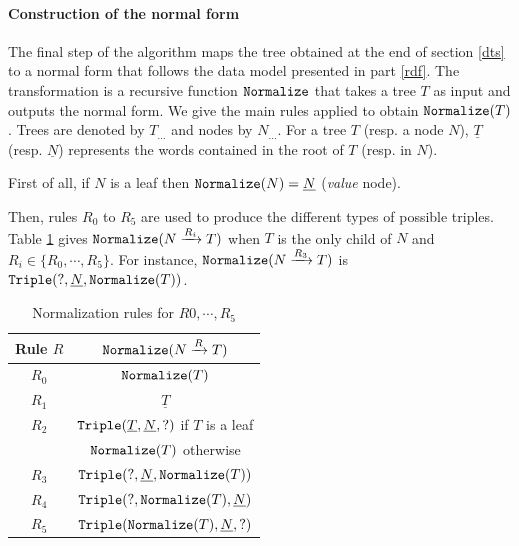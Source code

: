 
\paragraph{Construction of the normal form}
\label{cot}

The final step of the algorithm maps the tree obtained at the end of section \ref{dts} to a normal form that follows the data model presented in part \ref{rdf}. The transformation is a recursive function $\texttt{Normalize}$ that takes a tree $T$ as input and outputs the normal form. We give the main rules applied to obtain $\texttt{Normalize}(T)$. Trees are denoted by $T_{...}$ and nodes by $N_{...}$. For a tree $T$ (resp. a node $N$), $\underline{T}$ (resp. $\underline{N}$) represents the words contained in the root of $T$ (resp. in $N$).

First of all, if $N$ is a leaf then $\texttt{Normalize}(N) = \underline{N}$ (\textit{value} node).

Then, rules $R_0$ to $R_5$ are used to produce the different types of possible triples. Table \ref{normtab} gives $\texttt{Normalize}(N \xrightarrow{R_i} T)$ when $T$ is the only child of $N$ and $R_i \in \{R_0, \cdots, R_5\}$. For instance, $\texttt{Normalize}(N \xrightarrow{R_3} T)$ is $\texttt{Triple}(?,\underline{N},\texttt{Normalize}(T))$.

\begin{table}
  \begin{center}
    \begin{tabular}{c c}
      \hline \hline
      Rule $R$ & $\texttt{Normalize}(N \xrightarrow{R} T)$ \\ \hline
      $R_0$    & $\texttt{Normalize}(T)$ \rule[-7pt]{0pt}{20pt} \\
      $R_1$    & $\underline{T}$ \rule[-7pt]{0pt}{20pt} \\
      $R_2$    & $\texttt{Triple}(\underline{T},\underline{N},?)$ if $T$ is a leaf \rule[-7pt]{0pt}{20pt} \\
               & $\texttt{Normalize}(T)$ otherwise \rule[-7pt]{0pt}{20pt} \\
      $R_3$    & $\texttt{Triple}(?,\underline{N},\texttt{Normalize}(T))$  \rule[-7pt]{0pt}{20pt}\\
      $R_4$    & $\texttt{Triple}(?,\texttt{Normalize}(T),\underline{N})$ \rule[-7pt]{0pt}{20pt}\\
      $R_5$    & $\texttt{Triple}(\texttt{Normalize}(T),\underline{N},?)$ \rule[-7pt]{0pt}{20pt}\\ \hline
    \end{tabular}
  \end{center}
\caption{Normalization rules for $R0, \cdots, R_5$}
\label{normtab}
\end{table}

